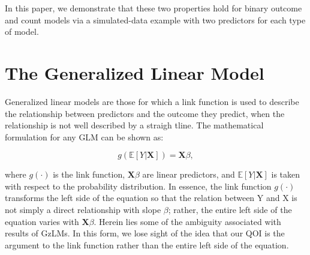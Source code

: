 \documentclass[jou, apacite]{apa6}
\begin{document}






In this paper, we demonstrate that these two properties hold for binary outcome and count models via a simulated-data example with two predictors for each type of model.
 
\section{The Generalized Linear Model}
Generalized linear models are those for which a link function is used to describe the relationship between predictors and the outcome they predict, when the relationship is not well described by a straigh tline. 
The mathematical formulation for any GLM can be shown as:

\begin{equation}
g(\mathbb{E}[Y|\bm{X}]) = \bm{X} \beta ,
\end{equation}

where $g(\cdot)$ is the link function, $\bm{X}\beta$ are linear predictors, and $\mathbb{E}[Y|\bm{X}]$ is taken with respect to the probability distribution. In essence, the link function $g(\cdot)$ transforms the left side of the equation so that the relation between Y and X is not simply a direct relationship with slope $\beta$; rather, the entire left side of the equation varies with $\bm{X}\beta$.
Herein lies some of the ambiguity associated with results of GzLMs.
In this form, we lose sight of the idea that our QOI is the argument to the link function rather than the entire left side of the equation.
\end{document}
